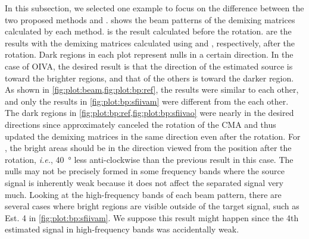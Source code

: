 \documentclass[sip,biber]{now-journal}
\begin{document}
In this subsection, we selected one example to focus on the difference between the two proposed methods \SFIIVAo{} and \SFIIVAm{}.
 shows the beam patterns of the demixing matrices calculated by each method.
 is the result calculated before the rotation.
 are the results with the demixing matrices calculated using \SFIIVAo{} and \SFIIVAm{}, respectively, after the rotation.
Dark regions in each plot represent nulls in a certain direction.
In the case of OIVA, the desired result is that the direction of the estimated source is toward the brighter regions, and that of the others is toward the darker region.
As shown in \cref{fig:plot:beam,fig:plot:bp:ref}, the results were similar to each other, and only the results in \cref{fig:plot:bp:sfiivam} were different from the each other.
The dark regions in \cref{fig:plot:bp:ref,fig:plot:bp:sfiivao} were nearly in the desired directions since \SFIIVAo{} approximately canceled the rotation of the CMA and thus updated the demixing matrices in the same direction even after the rotation.
For \SFIIVAm{}, the bright areas should be in the direction viewed from the position after the rotation, \emph{i.e.}, \SI{40}{\degree} less anti-clockwise than the previous result in this case.
The nulls may not be precisely formed in some frequency bands where the source signal is inherently weak because it does not affect the separated signal very much.
Looking at the high-frequency bands of each beam pattern, there are several cases where bright regions are visible outside of the target signal, such as Est. 4 in \cref{fig:plot:bp:sfiivam}.
We suppose this result might happen since the 4th estimated signal in high-frequency bands was accidentally weak.
\end{document}
